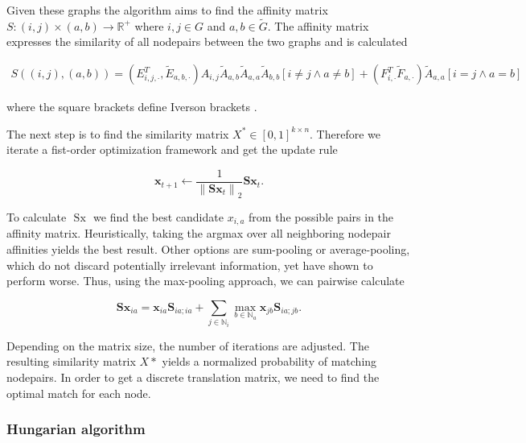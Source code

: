 Given these graphs the algorithm aims to find the affinity matrix $S:(i, j) \times(a, b) \rightarrow \mathbb{R}^{+}$ where $i, j \in G$ and $a, b \in \widetilde{G}$. The affinity matrix expresses the similarity of all nodepairs between the two graphs and is calculated 

\begin{equation}
    \begin{array}{l}
        S((i, j),(a, b)) = \left(E_{i, j, \cdot}^{T}, \widetilde{E}_{a, b, \cdot}\right) A_{i, j} \widetilde{A}_{a, b} \widetilde{A}_{a, a} \widetilde{A}_{b, b}[i \neq j \wedge a \neq b] + \left(F_{i, \cdot}^{T} \widetilde{F}_{a, \cdot}\right) \widetilde{A}_{a, a}[i=j \wedge a=b]
    \end{array}
\label{eq3:s}
\end{equation}

where the square brackets define Iverson brackets \cite{simonovsky_graphvae_2018}.


The next step is to find the similarity matrix $X^* \in[0,1]^{k \times n}$. Therefore we iterate a fist-order optimization framework and get the update rule

\begin{equation}
    \mathbf{x}_{t+1} \leftarrow \frac{1}{\left\|\mathbf{S} \mathbf{x}_{t}\right\|_{2}} \mathbf{S} \mathbf{x}_{t}.
\end{equation}

To calculate $\text { Sx }$ we find the best candidate $x_{i,a}$ from the possible pairs in the affinity matrix. Heuristically, taking the argmax over all neighboring nodepair affinities yields the best result. Other options are sum-pooling or average-pooling, which do not discard potentially irrelevant information, yet have shown to perform worse. Thus, using the max-pooling approach, we can pairwise calculate

\begin{equation}
    \mathbf{Sx}_{i a}=\mathbf{x}_{i a} \mathbf{S}_{i a ; i a}+\sum_{j \in \mathbb{N}_{i}} \max _{b \in \mathbb{N}_{a}} \mathbf{x}_{j b} \mathbf{S}_{i a ; j b}.
\end{equation}

Depending on the matrix size, the number of iterations are adjusted. The resulting similarity matrix $X*$ yields a normalized probability of matching nodepairs. In order to get a discrete translation matrix, we need to find the optimal match for each node.



\subsubsection{Hungarian algorithm}
\label{ssec3:hung}


